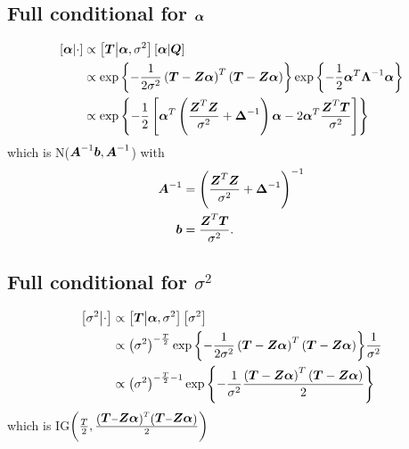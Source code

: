 \documentclass{article}\usepackage[]{graphicx}\usepackage[]{color}
\def\bm#1{\mbox{\boldmath $#1$}}
\begin{document}
\subsection{Full conditional for $\bm{\alpha}$}
%
\begin{align*}
%
\left[ \bm{\alpha} \middle| \cdot \right] & \propto \left[ \bm{T} \middle| \bm{\alpha}, \sigma^2 \right] \left[ \bm{\alpha} \middle| \bm{Q} \right]\\
%
& \propto \exp{ \left\{ - \frac{1} {2 \sigma^2} \left( \bm{T} - \bm{Z} \bm{\alpha} \right)^T \left( \bm{T} - \bm{Z} \bm{\alpha} \right) \right\} } \exp{ \left\{ - \frac{1} {2} \bm{\alpha}^T \bm{\Lambda}^{ - 1} \bm{\alpha} \right\} } \\
%
& \propto \exp{ \left\{ - \frac{1} {2} \left[ \bm{\alpha}^T \left( \frac{ \bm{Z}^T \bm{Z}} {\sigma^2} + \bm{\Delta}^{ - 1} \right) \bm{\alpha} - 2 \bm{\alpha}^T \frac{\bm{Z}^T \bm{T}} {\sigma^2} \right] \right\} }
%
\end{align*}
%
which is N($\bm{A}^{ - 1}\bm{b}, \bm{A}^{ - 1}$) with \\
%
\begin{align*}
%
\bm{A}^{ - 1} & = \left( \frac{ \bm{Z}^T \bm{Z}} {\sigma^2} + \bm{\Delta}^{ - 1} \right)^{ - 1}\\
%
\bm{b} & = \frac{\bm{Z}^T \bm{T}} {\sigma^2}. \\
%
\end{align*}
%
%
\subsection{Full conditional for $\sigma^2$}
%
\begin{align*}
%
\left[ \sigma^2 \middle| \cdot \right] & \propto \left[ \bm{T} \middle| \bm{\alpha}, \sigma^2 \right] \left[ \sigma^2 \right]\\
%
& \propto \left( \sigma^2 \right)^{ - \frac{T} {2}} \exp{ \left\{ - \frac{1} {2 \sigma^2} \left( \bm{T} - \bm{Z} \bm{\alpha} \right)^T \left( \bm{T} - \bm{Z} \bm{\alpha} \right) \right\} } \frac{1} {\sigma^2}\\ 
%
& \propto \left( \sigma^2 \right)^{ - \frac{T} {2} - 1} \exp{ \left\{ - \frac{1} {\sigma^2} \frac{\left( \bm{T} - \bm{Z} \bm{\alpha} \right)^T \left( \bm{T} - \bm{Z} \bm{\alpha} \right)} {2} \right\} } \\ 
%
\end{align*}
%
which is IG$\left( \frac{T} {2}, \frac{\left( \bm{T} - \bm{Z} \bm{\alpha} \right)^T \left( \bm{T} - \bm{Z} \bm{\alpha} \right)} {2} \right)$
%
\end{document}
